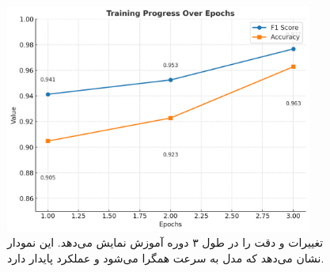 \begin{figure}[h!]
\centering
\includegraphics[width=0.9\textwidth]{images/fig_training_progress_en}
\caption{تغییرات  و دقت را در طول ۳ دوره آموزش نمایش می‌دهد. این نمودار نشان می‌دهد که مدل به سرعت همگرا می‌شود و عملکرد پایدار دارد.}
\label{fig:training_progress}
\end{figure}

     
     
     
     
     
     
     
     
     
     
     
     